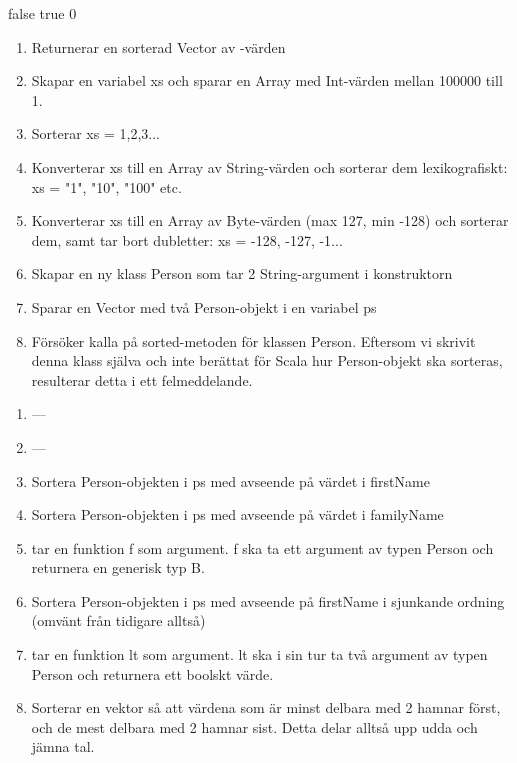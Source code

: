 \Subtask
\begin{REPLnonum}
false
true
0
\end{REPLnonum}


\Task %

\Subtask
\begin{enumerate}
\item Returnerar en sorterad Vector av -värden
\item Skapar en variabel xs och sparar en Array med Int-värden mellan 100000 till 1.
\item Sorterar xs = 1,2,3...
\item Konverterar xs till en Array av String-värden och sorterar dem lexikografiskt: xs = "1", "10", "100" etc.
\item Konverterar xs till en Array av Byte-värden (max 127, min -128) och sorterar dem, samt tar bort dubletter: xs = -128, -127, -1...
\item Skapar en ny klass Person som tar 2 String-argument i konstruktorn
\item Sparar en Vector med två Person-objekt i en variabel ps
\item Försöker kalla på sorted-metoden för klassen Person. Eftersom vi skrivit denna klass själva och inte berättat för Scala hur Person-objekt ska sorteras, resulterar detta i ett felmeddelande.
\end{enumerate}

\Subtask 

\begin{enumerate}
\item ---
\item ---
\item Sortera Person-objekten i ps med avseende på värdet i firstName
\item Sortera Person-objekten i ps med avseende på värdet i familyName 
\item {} tar en funktion f som argument. f ska ta ett argument av typen Person och returnera en generisk typ B.
\item Sortera Person-objekten i ps med avseende på firstName i sjunkande ordning (omvänt från tidigare alltså)
\item {} tar en funktion lt som argument. lt ska i sin tur ta två argument av typen Person och returnera ett boolskt värde.
\item Sorterar en vektor så att värdena som är minst delbara med 2 hamnar först, och de mest delbara med 2 hamnar sist. Detta delar alltså upp udda och jämna tal.
\end{enumerate}

